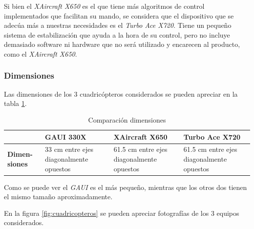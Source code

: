 \documentclass[main]{subfiles}
\begin{document}
	Si bien el \emph{XAircraft X650} es el que tiene m\'as algoritmos de control implementados que facilitan su mando, se considera que el dispositivo que se adec\'ua m\'as a nuestras necesidades es el \emph{Turbo Ace X720}. Tiene un peque\~no sistema de estabilizaci\'on que ayuda a la hora de su control, pero no incluye demasiado software ni hardware que no ser\'a utilizado y encarecen al producto, como el \emph{XAircraft X650}.

\subsubsection*{Dimensiones}

	Las dimensiones de los 3 cuadric\'opteros considerados se pueden apreciar en la tabla \ref{tab:dimensiones}.

\begin{table}[H]
\begin{tabular}{p{40pt}|p{80pt}|p{130pt}|p{130pt}|} 
\cline{2-4}
& \cellcolor[gray]{0.8} \textbf{GAUI 330X} 
& \cellcolor[gray]{0.8} \textbf{XAircraft X650} 
& \cellcolor[gray]{0.8} \textbf{Turbo Ace X720} \\ \cline{2-4} \hline
\multicolumn{1}{|p{40pt}|}{\cellcolor[gray]{0.8}\textbf{Dimen- siones}} 
& 33 cm entre ejes diagonalmente opuestos & 61.5 cm entre ejes diagonalmente opuestos & 61.5 cm entre ejes diagonalmente opuestos \\ 
\hline 
\end{tabular}
\caption{Comparaci\'on dimensiones}
\label{tab:dimensiones}
\end{table}

	Como se puede ver el \emph{GAUI} es el m\'as peque\~no, mientras que los otros dos tienen el mismo tama\~no aproximadamente.

	En la figura \ref{fig:cuadricopteros} se pueden apreciar fotograf\'ias de los 3 equipos considerados.
\end{document}
